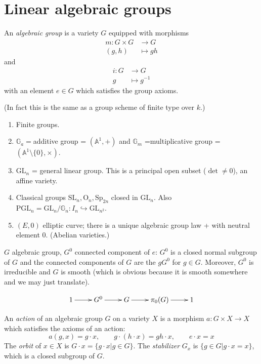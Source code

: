 \section{Linear algebraic groups}
\label{section-linear-algebraic-groups}
\begin{definition}
\label{definition-algebraic-group}
An {\it algebraic group} is a variety $G$ equipped with morphisms
\begin{align*}
m: G\times G &\longrightarrow G \\
(g,h) &\longmapsto gh
\end{align*}
and
\begin{align*}
i: G &\longrightarrow G \\
g &\longmapsto g^{-1}
\end{align*}
with an element $e \in G$ which satisfies the group axioms.
\end{definition}

(In fact this is the same as a group scheme of finite type over $k$.)

\begin{example}
\label{example-algebraic-groups}
\begin{enumerate}
\item Finite groups.
\item $\mathbb{G}_a=$additive group = $(\mathbb{A}^1,+)$ and $\mathbb{G}_m$
=multiplicative group = $(\mathbb{A}^1\setminus\{0\},\times)$.
\item $\text{GL}_n$ = general linear group. This is a principal open subset
($\det \neq 0$), an affine variety.
\item Classical groups $\text{SL}_n,\text{O}_n,\text{Sp}_{2n}$ closed in 
$\text{GL}_n$. Also 
$\text{PGL}_n=\text{GL}_n/\mathbb{G}_n:I_n\hookrightarrow\text{GL}_{n^2}$.
\item $(E,0)$ elliptic curve; there is a unique algebraic group law + with
neutral element $0$. (Abelian varieties.)
\end{enumerate}
\end{example}

\begin{proposition}
\label{proposition-connected-components-of-algebraic-group}
$G$ algebraic group, $G^0$ connected component of $e$: $G^0$ is a closed normal
subgroup of $G$ and the connected components of $G$ are the $gG^0$ for $g \in
G$. Moreover, $G^0$ is irreducible and $G$ is smooth (which is obvious because
it is smooth somewhere and we may just translate).
\end{proposition}
$$
\xymatrix{
1\ar[r]&G^0\ar[r]&G\ar[r]&\pi_0(G)\ar[r]&1
}
$$
\begin{definition}
\label{definition-action-of-algebraic-group}
An {\it action} of an algebraic group $G$ on a variety $X$ is a morphism $a:G
\times X \to X$ which satisfies the axioms of an action:
$$
a(g,x)=g\cdot x,\qquad  g\cdot(h\cdot x)=gh\cdot x,\qquad  e\cdot x=x
$$
The {\it orbit} of $x \in X$ is $G\cdot x=\{g\cdot x|g \in G\}$. The {\it
stabilizer} $G_x$ is $\{g \in G|g\cdot x=x\}$, which is a closed subgroup of
$G$.
\end{definition}

